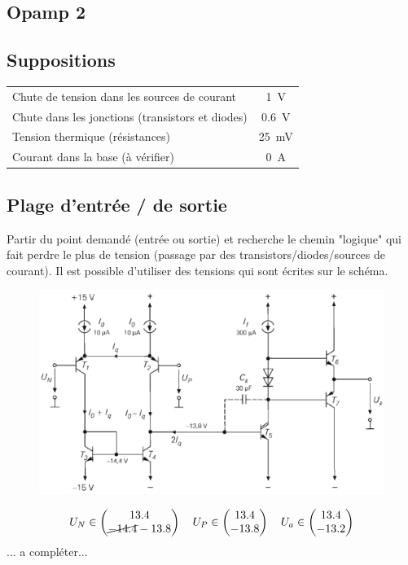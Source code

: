 \documentclass[resume]{subfiles}
\begin{document}
\begin{multicols}{3}
\section{Opamp 2}
\subsection{Suppositions}
\begin{tabular}{p{6cm}c}
Chute de tension dans les sources de courant & \SI{1}{\volt}\\
Chute dans les jonctions (transistors et diodes) & \SI{0.6}{\volt}\\
Tension thermique (résistances) & \SI{25}{\milli\volt}\\
Courant dans la base (à vérifier) & \SI{0}{\ampere}
\end{tabular}
\subsection{Plage d'entrée / de sortie}
Partir du point demandé (entrée ou sortie) et recherche le chemin "logique" qui fait perdre le plus de tension (passage par des transistors/diodes/sources de courant). Il est possible d'utiliser des tensions qui sont écrites sur le schéma.
\begin{figure}[H]
\centering
\includegraphics[width=\columnwidth]{img_52.png}
\end{figure}
$$U_N\in\begin{pmatrix}13.4\\ \cancel{-14.4}-13.8\end{pmatrix}\quad U_P\in\begin{pmatrix}13.4\\-13.8\end{pmatrix}\quad U_a\in\begin{pmatrix}13.4\\-13.2\end{pmatrix}$$
... a compléter...

\end{multicols}
\end{document}
